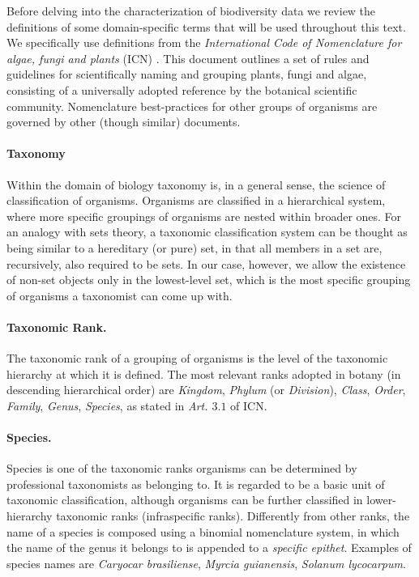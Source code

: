 Before delving into the characterization of biodiversity data we review the definitions of some domain-specific terms that will be used throughout this text. 
We specifically use definitions from the \textit{International Code of Nomenclature for algae, fungi and plants} (ICN) \cite{McNeill2012}. This document outlines a set of rules and guidelines for scientifically naming and grouping plants, fungi and algae, consisting of a universally adopted reference by the botanical scientific community. Nomenclature best-practices for other groups of organisms are governed by other (though similar) documents.

\paragraph*{Taxonomy}
Within the domain of biology taxonomy is, in a general sense, the science of classification of organisms. 
Organisms are classified in a hierarchical system, where more specific groupings of organisms are nested within broader ones. 
For an analogy with sets theory, a taxonomic classification system can be thought as being similar to a hereditary (or pure) set, in that all members in a set are, recursively, also required to be sets. In our case, however, we allow the existence of non-set objects only in the lowest-level set, which is the most specific grouping of organisms a taxonomist can come up with.

\paragraph*{Taxonomic Rank.}
The taxonomic rank of a grouping of organisms is the level of the taxonomic hierarchy at which it is defined. The most relevant ranks adopted in botany (in descending hierarchical order) are \textit{Kingdom}, \textit{Phylum} (or \textit{Division}), \textit{Class}, \textit{Order}, \textit{Family}, \textit{Genus}, \textit{Species}, as stated in \textit{Art. $3.1$} of ICN.

\paragraph*{Species.}
Species is one of the taxonomic ranks organisms can be determined by professional taxonomists as belonging to. It is regarded to be a basic unit of taxonomic classification, although organisms can be further classified in lower-hierarchy taxonomic ranks (infraspecific ranks).
Differently from other ranks, the name of a species is composed using a binomial nomenclature system, in which the name of the genus it belongs to is appended to a \textit{specific epithet}.
Examples of species names are \textit{Caryocar brasiliense}, \textit{Myrcia guianensis}, \textit{Solanum lycocarpum}.

